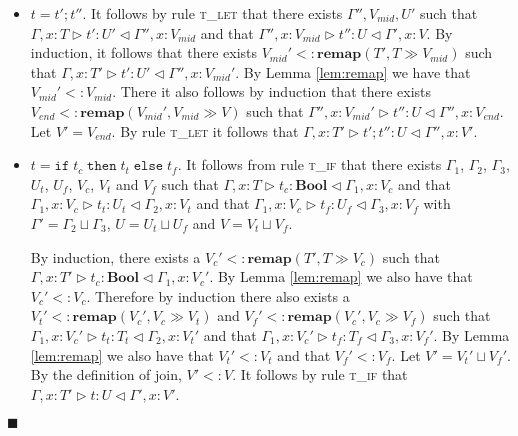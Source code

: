 \documentclass{article}
\newcommand{\lemref}[1]{Lemma \ref{#1}}
\newcommand{\tlet}{\textsc{t\_let} }
\newcommand{\tif}{\textsc{t\_if} }
\newcommand{\remapapp}[3]{\ensuremath{\mathbf{remap}(#1, #2 \gg #3)}}
\newcommand{\typerule}[4]{#1 \triangleright #2 : #3 \triangleleft #4}
\newcommand{\boolt}{\mathbf{Bool}}
\newcommand{\ift}[3]{\mathtt{if} \; #1 \; \mathtt{then} \; #2 \; \mathtt{else} \; #3}
\newcommand{\qed}{$\blacksquare$}
\newenvironment{proof}{\vspace{1ex}\noindent{\bf Proof}\hspace{0.5em}}
  {\hfill\qed\vspace{1ex}}
\begin{document}
\begin{proof}
\begin{itemize}
\begin{itemize}
\end{itemize}

\item $t = t' ; t''$. It follows by rule \tlet that there exists
$\Gamma'', V_{mid}, U'$ 
such that $\typerule{\Gamma, x : T}{t'}{U'}{\Gamma'', x : V_{mid}}$
and that $\typerule{\Gamma'', x : V_{mid}}{t''}{U}{\Gamma', x : V}$.
By induction, it follows that there exists $V_{mid}' <: \remapapp{T'}{T}{V_{mid}}$ 
such that $\typerule{\Gamma, x : T'}{t'}{U'}{\Gamma'', x : V_{mid}'}$.
By \lemref{lem:remap} we have that $V_{mid}' <: V_{mid}$.
There it also follows by induction that 
there exists $V_{end} <: \remapapp{V_{mid}'}{V_{mid}}{V}$ such that
$\typerule{\Gamma'', x : V_{mid}'}{t''}{U}{\Gamma'', x : V_{end}}$.
Let $V' = V_{end}$. By rule \tlet it follows that
$\typerule{\Gamma, x : T'}{t' ; t''}{U}{\Gamma'', x : V'}$.

\item $t = \ift{t_c}{t_t}{t_f}$. It follows from rule \tif that there
exists $\Gamma_1$, $\Gamma_2$, $\Gamma_3$, $U_t$, $U_f$, $V_c$, $V_t$ and
$V_f$
such that
$\typerule{\Gamma, x : T}{t_c}{\boolt}{\Gamma_1, x : V_c}$ and that
$\typerule{\Gamma_1, x : V_c}{t_t}{U_t}{\Gamma_2, x : V_t}$ and that
$\typerule{\Gamma_1, x : V_c}{t_f}{U_f}{\Gamma_3, x : V_f}$ with
$\Gamma' = \Gamma_2 \sqcup \Gamma_3$, $U = U_t \sqcup U_f$ and
$V = V_t \sqcup V_f$.

By induction, there exists a $V_c' <: \remapapp{T'}{T}{V_c}$
such that $\typerule{\Gamma, x : T'}{t_c}{\boolt}{\Gamma_1, x : V_c'}$.
By \lemref{lem:remap} we also have that $V_c' <: V_c$.
Therefore by induction there also exists a 
$V_t' <: \remapapp{V_c'}{V_c}{V_t}$ and $V_f' <: \remapapp{V_c'}{V_c}{V_f}$
such that $\typerule{\Gamma_1, x : V_c'}{t_t}{T_t}{\Gamma_2, x : V_t'}$
and that $\typerule{\Gamma_1, x : V_c'}{t_f}{T_f}{\Gamma_3, x : V_f'}$.
By \lemref{lem:remap} we also have that $V_t' <: V_t$ and that
$V_f' <: V_f$.
Let $V' = V_t' \sqcup V_f'$. By the definition of join, $V' <: V$.
It follows by rule \tif that
$\typerule{\Gamma, x : T'}{t}{U}{\Gamma', x : V'}$.

\end{itemize}

\end{proof}
\end{document}
